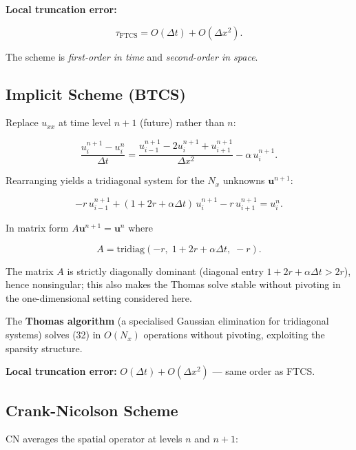 \documentclass[11pt,a4paper]{article}
\begin{document}
\textbf{Local truncation error:}

\begin{equation}
\tau_{\text{FTCS}} = O(\Delta t) + O(\Delta x^2). \tag{29}
\end{equation}

The scheme is \emph{first-order in time} and \emph{second-order in space}.

\subsection{Implicit Scheme (BTCS)}

Replace $u_{xx}$ at time level $n+1$ (future) rather than $n$:

\begin{equation}
\frac{u_i^{n+1} - u_i^n}{\Delta t} = \frac{u_{i-1}^{n+1} - 2u_i^{n+1} + u_{i+1}^{n+1}}{\Delta x^2} - \alpha\, u_i^{n+1}. \tag{30}
\end{equation}

Rearranging yields a tridiagonal system for the $N_x$ unknowns $\mathbf{u}^{n+1}$:

\begin{equation}
-r\, u_{i-1}^{n+1} + (1 + 2r + \alpha\Delta t)\, u_i^{n+1} - r\, u_{i+1}^{n+1} = u_i^n. \tag{31}
\end{equation}

In matrix form $A\mathbf{u}^{n+1} = \mathbf{u}^n$ where

\begin{equation}
A = \mathrm{tridiag}(-r,\; 1+2r+\alpha\Delta t,\; -r). \tag{32}
\end{equation}

The matrix $A$ is strictly diagonally dominant (diagonal entry $1+2r+\alpha\Delta t > 2r$), hence nonsingular; this also makes the Thomas solve stable without pivoting in the one-dimensional setting considered here.

The \textbf{Thomas algorithm} (a specialised Gaussian elimination for tridiagonal systems) solves (32) in $O(N_x)$ operations without pivoting, exploiting the sparsity structure.

\textbf{Local truncation error:} $O(\Delta t) + O(\Delta x^2)$ — same order as FTCS.

\subsection{Crank-Nicolson Scheme}

CN averages the spatial operator at levels $n$ and $n+1$:
\end{document}
